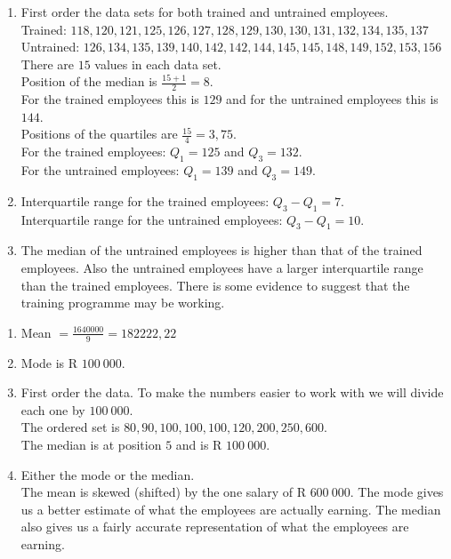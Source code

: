 \begin{solutions}{}
{}
\item %
\begin{enumerate}[noitemsep, label=\textbf{(\alph*)} ]
\item
First order the data sets for both trained and untrained employees.\\
Trained: $118, 120, 121, 125, 126, 127, 128, 129, 130, 130, 131, 132, 134, 135, 137$ \\
Untrained: $126, 134, 135, 139, 140, 142, 142, 144, 145, 145, 148, 149, 152, 153, 156$ \\
There are $15$ values in each data set. \\
Position of the median is $\frac{15+1}{2}=8$. \\
For the trained employees this is $129$ and for the untrained employees this is $144$.\\
Positions of the quartiles are $\frac{15}{4}=3,75$.\\
For the trained employees: $Q_1=125$ and $Q_3=132$.\\
For the untrained employees: $Q_1=139$ and $Q_3=149$.\\
\item
Interquartile range for the trained employees: $Q_3-Q_1=7$.\\
Interquartile range for the untrained employees: $Q_3-Q_1=10$.\\
\item
The median of the untrained employees is higher than that of the trained employees. Also the untrained employees have a larger interquartile range than the trained employees. There is some evidence to suggest that the training programme may be working.
\end{enumerate}
\item %
\begin{enumerate}[noitemsep, label=\textbf{(\alph*)} ]
\item
Mean $=\frac{1640000}{9}=182222,22$
\item
Mode is R $100~000$.
\item
 First order the data. To make the numbers easier to work with we will divide each one by $100~000$.\\
 The ordered set is $80, 90, 100, 100, 100, 120, 200, 250, 600$.  \\
The median is at position $5$ and is R $100~000$.
\item
Either the mode or the median. \\
The mean is skewed (shifted) by the one salary of R $600~000$. The mode gives us a better estimate of what the employees are actually earning. The median also gives us a fairly accurate representation of what the employees are earning.



\end{enumerate}
\end{solutions}
